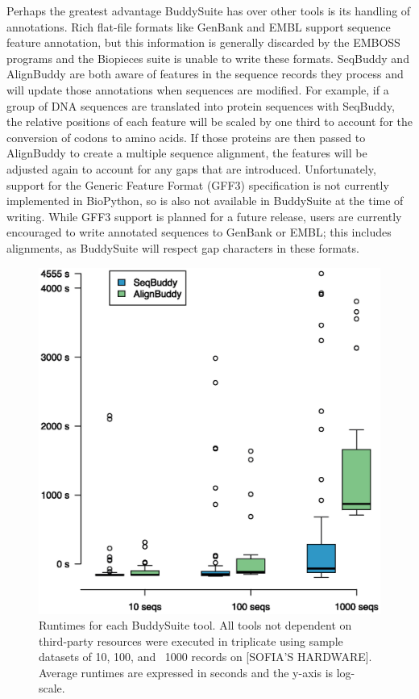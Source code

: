 \documentclass[nogrid]{MBE_article}%
\begin{document}
Perhaps the greatest advantage BuddySuite has over other tools is its handling of annotations. Rich flat-file formats like GenBank and EMBL support sequence feature annotation, but this information is generally discarded by the EMBOSS programs and the Biopieces suite is unable to write these formats. SeqBuddy and AlignBuddy are both aware of features in the sequence records they process and will update those annotations when sequences are modified. For example, if a group of DNA sequences are translated into protein sequences with SeqBuddy, the relative positions of each feature will be scaled by one third to account for the conversion of codons to amino acids. If those proteins are then passed to AlignBuddy to create a multiple sequence alignment, the features will be adjusted again to account for any gaps that are introduced. Unfortunately, support for the Generic Feature Format (GFF3) specification is not currently implemented in BioPython, so is also not available in BuddySuite at the time of writing. While GFF3 support is planned for a future release, users are currently encouraged to write annotated sequences to GenBank or EMBL; this includes alignments, as BuddySuite will respect gap characters in these formats.

\begin{figure}[t]
\begin{center}
\includegraphics[height=0.4\textheight]{figures/timeit.eps}
\end{center}
\caption{Runtimes for each BuddySuite tool. All tools not dependent on third-party resources were executed in triplicate using sample datasets of 10, 100, and ~1000 records on [SOFIA'S HARDWARE]. Average runtimes are expressed in seconds and the y-axis is log-scale.}
\label{fig:timeit}
\end{figure}
\end{document}
